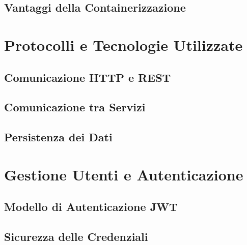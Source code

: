 \documentclass[12pt,a4paper]{report}
\begin{document}
\section{Vantaggi della Containerizzazione}

\chapter{Protocolli e Tecnologie Utilizzate}
\label{cap:protocolli}

\section{Comunicazione HTTP e REST}

\section{Comunicazione tra Servizi}

\section{Persistenza dei Dati}

\chapter{Gestione Utenti e Autenticazione}
\label{cap:autenticazione}

\section{Modello di Autenticazione JWT}

\section{Sicurezza delle Credenziali}
\end{document}
